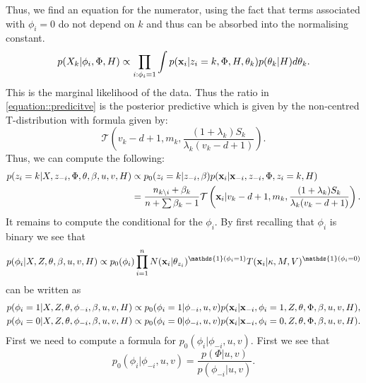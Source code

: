 \documentclass[12pt,english]{article}\usepackage[]{graphicx}\usepackage[]{color}
\begin{document}
Thus, we find an equation for the numerator, using the fact that terms associated with $\phi_i = 0$ do not depend on $k$ and thus can be absorbed into the normalising constant.
\begin{equation}
\begin{split}
p(X_{k}|\phi_i, \Phi, H) &\propto \prod_{i:\phi_i =1}\int p({\bf x}_i| z_i = k, \Phi, H, \theta_{k})p(\theta_{k}|H) d\theta_{k}.\\
\end{split}
\end{equation}
This is the marginal likelihood of the data. Thus the ratio in \ref{equation::predicitve} is the posterior predictive which is given by the non-centred T-distribution with formula given by:
\[\mathcal{T}\left(v_k - d + 1, m_k,  \frac{(1+\lambda_k)S_k}{\lambda_k (v_k - d + 1)} \right).\]
Thus, we can compute the following:
\begin{equation} \label{equation::alloc2}
\begin{split}
p(z_i = k|X,z_{-i},\Phi, \theta, \beta, u,v, H) & \propto p_0(z_i = k|z_{-i},\beta)p({\bf x}_i|{\bf x}_{-i},z_{-i},\Phi, z_i = k, H)\\
& = \frac{n_{k \backslash i} + \beta_k}{n + \sum \beta_k - 1}\mathcal{T}\left({\bf x}_i|v_k - d + 1, m_k,  \frac{(1+\lambda_k)S_k}{\lambda_k (v_k - d + 1)} \right) .
\end{split}
\end{equation}
It remains to compute the conditional for the $\phi_i$. By first recalling that $\phi_i$ is binary we see that
\begin{equation}
p(\phi_i|X,Z,\theta, \beta, u,v, H) \propto p_0(\phi_i)\prod_{i = 1}^{n}N({\bf x}_i|\theta_{z_i})^{\mathds{1}(\phi_i=1)}T({\bf x}_i|\kappa, M, V)^{\mathds{1}(\phi_i=0)}
\end{equation}
can be written as
\begin{equation}
\begin{split}
p(\phi_i = 1|X,Z,\theta, \phi_{-i}, \beta, u,v, H) &\propto p_0(\phi_i = 1|\phi_{-i},u,v)p({\bf x}_i|{\bf x}_{-i},\phi_i =1,Z,\theta, \Phi, \beta, u,v, H), \\
p(\phi_i = 0|X,Z,\theta,\phi_{-i}, \beta, u,v, H) &\propto p_0(\phi_i = 0|\phi_{-i},u,v)p({\bf x}_i|{\bf x}_{-i},\phi_i=0,Z,\theta, \Phi, \beta, u,v, H). \\
\end{split}
\end{equation}
First we need to compute a formula for  $p_0(\phi_i|\phi_{-i},u,v)$. First we see that
\begin{equation}
p_0(\phi_i|\phi_{-i},u,v) = \frac{p(\Phi|u,v)}{p(\phi_{-i}|u,v)}.
\end{equation}
\end{document}
